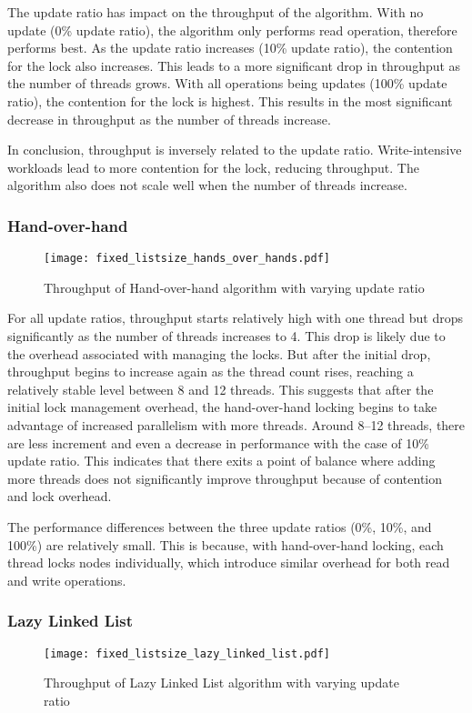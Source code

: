 \documentclass[12pt,a4paper]{article}
\begin{document}
The update ratio has impact on the throughput of the algorithm. With no update (0\% update ratio), the algorithm only performs read operation, therefore performs best. As the update ratio increases (10\% update ratio), the contention for the lock also increases. This leads to a more significant drop in throughput as the number of threads grows. With all operations being updates (100\% update ratio), the contention for the lock is highest. This results in the most significant decrease in throughput as the number of threads increase.

In conclusion, throughput is inversely related to the update ratio. Write-intensive workloads lead to more contention for the lock, reducing throughput. The algorithm also does not scale well when the number of threads increase.

\subsubsection{Hand-over-hand}
\begin{figure}[h]
    \centering
    \texttt{[image: fixed\_listsize\_hands\_over\_hands.pdf]}
    \caption{Throughput of Hand-over-hand algorithm with varying update ratio}
    \label{fig:fixed_listsize_hands_over_hands}
\end{figure}

For all update ratios, throughput starts relatively high with one thread but drops significantly as the number of threads increases to 4. This drop is likely due to the overhead associated with managing the locks. But after the initial drop, throughput begins to increase again as the thread count rises, reaching a relatively stable level between 8 and 12 threads. This suggests that after the initial lock management overhead, the hand-over-hand locking begins to take advantage of increased parallelism with more threads. Around 8–12 threads, there are less increment and even a decrease in performance with the case of 10\% update ratio. This indicates that there exits a point of balance where adding more threads does not significantly improve throughput because of contention and lock overhead.

The performance differences between the three update ratios (0\%, 10\%, and 100\%) are relatively small. This is because, with hand-over-hand locking, each thread locks nodes individually, which introduce similar overhead for both read and write operations.

\subsubsection{Lazy Linked List}
\begin{figure}[h]
    \centering
    \texttt{[image: fixed\_listsize\_lazy\_linked\_list.pdf]}
    \caption{Throughput of Lazy Linked List algorithm with varying update ratio}
    \label{fig:fixed_listsize_lazy_linked_list}
\end{figure}
\end{document}
